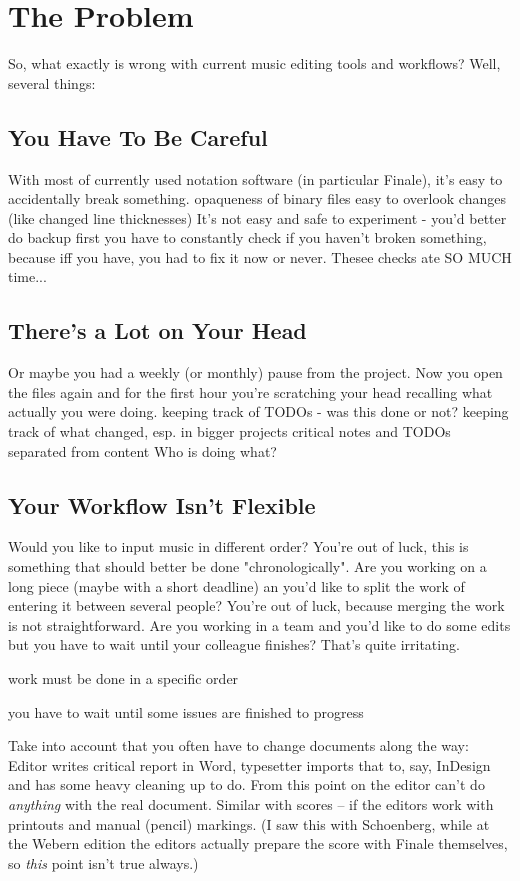 \documentclass[11pt,a4paper]{article}
\begin{document}
\section{The Problem}
So, what exactly is wrong with current music editing tools and workflows?
Well, several things:

\subsection{You Have To Be Careful}
With most of currently used notation software (in particular Finale), it's easy
to accidentally break something.
opaqueness of binary files
easy to overlook changes (like changed line thicknesses)
It's not easy and safe to experiment - you'd better do backup first
you have to constantly check if you haven't broken something,
because iff you have, you had to fix it now or never.
Thesee checks ate SO MUCH time...

\subsection{There's a Lot on Your Head}
Or maybe you had a weekly (or monthly) pause from the project.
Now you open the files again and for the first hour you're scratching your head
recalling what actually you were doing.
keeping track of TODOs - was this done or not?
keeping track of what changed, esp. in bigger projects
critical notes and TODOs separated from content
Who is doing what?

\subsection{Your Workflow Isn't Flexible}
Would you like to input music in different order?  You're out of luck,
this is something that should better be done "chronologically".
Are you working on a long piece (maybe with a short deadline) an you'd like to split the work
of entering it between several people?  You're out of luck,
because merging the work is not straightforward.
Are you working in a team and you'd like to do some edits but you have to wait
until your colleague finishes?  That's quite irritating.

work must be done in a specific order

you have to wait until some issues are finished to progress

Take into account that you often have to change documents along the way:
Editor writes critical report in Word, typesetter imports that to, say, InDesign
and has some heavy cleaning up to do. From this point on the editor can't do
\emph{anything} with the real document. Similar with scores -- if the editors work
with printouts and manual (pencil) markings. (I saw this with Schoenberg, while at
the Webern edition the editors actually prepare the score with Finale themselves,
so \emph{this} point isn't true always.)
\end{document}
